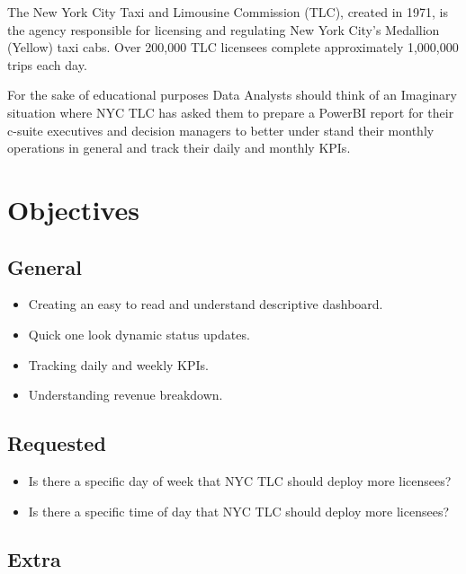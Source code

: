 \documentclass[
]{book}
\providecommand{\tightlist}{%
  \setlength{\itemsep}{0pt}\setlength{\parskip}{0pt}}
\begin{document}
The New York City Taxi and Limousine Commission (TLC), created in 1971, is the agency responsible for licensing and regulating New York City's Medallion (Yellow) taxi cabs. Over 200,000 TLC licensees complete approximately 1,000,000 trips each day.

For the sake of educational purposes Data Analysts should think of an Imaginary situation where NYC TLC has asked them to prepare a PowerBI report for their c-suite executives and decision managers to better under stand their monthly operations in general and track their daily and monthly KPIs.

\hypertarget{objectives}{%
\section{Objectives}\label{objectives}}

\hypertarget{general}{%
\subsection{General}\label{general}}

\begin{itemize}
\tightlist
\item
  Creating an easy to read and understand descriptive dashboard.
\item
  Quick one look dynamic status updates.
\item
  Tracking daily and weekly KPIs.
\item
  Understanding revenue breakdown.
\end{itemize}

\hypertarget{requested}{%
\subsection{Requested}\label{requested}}

\begin{itemize}
\tightlist
\item
  Is there a specific day of week that NYC TLC should deploy more licensees?
\item
  Is there a specific time of day that NYC TLC should deploy more licensees?
\end{itemize}

\hypertarget{extra}{%
\subsection{Extra}\label{extra}}
\end{document}
